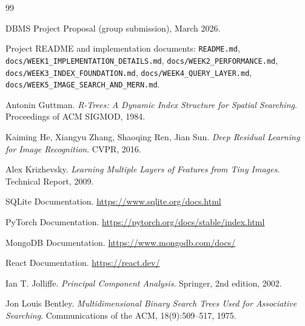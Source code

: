 \documentclass[11pt,a4paper]{article}
\begin{document}
\begin{thebibliography}{99}

DBMS Project Proposal (group submission), March 2026.

Project README and implementation documents:
\texttt{README.md},
\texttt{docs/WEEK1\_IMPLEMENTATION\_DETAILS.md},
\texttt{docs/WEEK2\_PERFORMANCE.md},
\texttt{docs/WEEK3\_INDEX\_FOUNDATION.md},
\texttt{docs/WEEK4\_QUERY\_LAYER.md},
\texttt{docs/WEEK5\_IMAGE\_SEARCH\_AND\_MERN.md}.

Antonin Guttman.
\textit{R-Trees: A Dynamic Index Structure for Spatial Searching}.
Proceedings of ACM SIGMOD, 1984.

Kaiming He, Xiangyu Zhang, Shaoqing Ren, Jian Sun.
\textit{Deep Residual Learning for Image Recognition}.
CVPR, 2016.

Alex Krizhevsky.
\textit{Learning Multiple Layers of Features from Tiny Images}.
Technical Report, 2009.

SQLite Documentation.
\url{https://www.sqlite.org/docs.html}

PyTorch Documentation.
\url{https://pytorch.org/docs/stable/index.html}

MongoDB Documentation.
\url{https://www.mongodb.com/docs/}

React Documentation.
\url{https://react.dev/}

Ian T. Jolliffe.
\textit{Principal Component Analysis}.
Springer, 2nd edition, 2002.

Jon Louis Bentley.
\textit{Multidimensional Binary Search Trees Used for Associative Searching}.
Communications of the ACM, 18(9):509--517, 1975.

\end{thebibliography}
\end{document}
